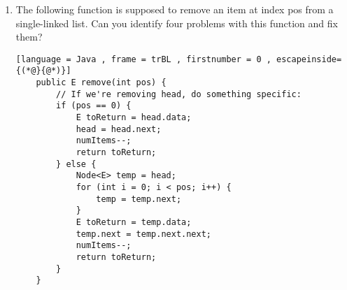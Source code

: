 \documentclass[letter]{article}
\begin{document}
\begin{enumerate}[1.]
\begin{lstlisting}[language = Java , frame = trBL , firstnumber = 0 , escapeinside={(*@}{@*)}]
            //TODO: Connect the tail of the newList to the correct position of the old list. 


        }
    }
    \end{lstlisting}

    
    \item The following function is supposed to remove an item at index pos from a single-linked list. Can you identify four problems with this function and fix them?

        
    \begin{lstlisting}[language = Java , frame = trBL , firstnumber = 0 , escapeinside={(*@}{@*)}]
    public E remove(int pos) {
        // If we're removing head, do something specific:
        if (pos == 0) {
            E toReturn = head.data;
            head = head.next;
            numItems--;
            return toReturn;
        } else {
            Node<E> temp = head;
            for (int i = 0; i < pos; i++) {
                temp = temp.next;
            }
            E toReturn = temp.data;
            temp.next = temp.next.next;
            numItems--;
            return toReturn;
        }
    }
    \end{lstlisting}
    
\end{enumerate}
\end{document}
